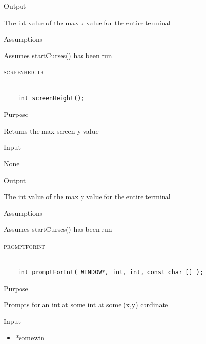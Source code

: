 \documentclass[pdftex, 11pt]{article}
\begin{document}
\begin{description}
\begin{description}
			\item{Output}

				The int value of the max x value for the entire terminal

			\item{Assumptions}

				Assumes startCurses() has been run

		\end{description}


	\item{\textsc{screenheigth}}

		\begin{lstlisting}

	int screenHeight();
		\end{lstlisting}

		\begin{description}
			\item{Purpose}

				Returns the max screen y value

			\item{Input}

				None

			\item{Output}

				The int value of the max y value for the entire terminal

			\item{Assumptions}

				Assumes startCurses() has been run

		\end{description}


	\item{\textsc{promptforint}}

		\begin{lstlisting}

	int promptForInt( WINDOW*, int, int, const char [] );
		\end{lstlisting}

		\begin{description}
			\item{Purpose}

				Prompts for an int at some int at some (x,y) cordinate

			\item{Input}

				\begin{itemize}

					\item{*somewin}


\end{itemize}
\end{description}
\end{description}
\end{document}
